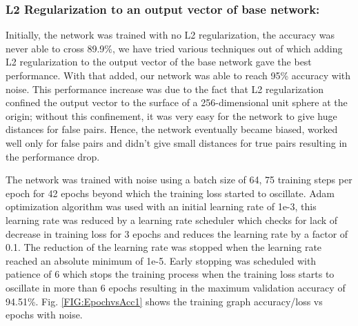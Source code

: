 \documentclass[10pt,twocolumn]{article}
\begin{document}
\subsubsection{L2 Regularization to an output vector of base network:}

Initially, the network was trained with no L2 regularization, the accuracy was never able to cross 89.9\%, we have tried various techniques out of which adding L2 regularization to the output vector of the base network gave the best performance. With that added, our network was able to reach 95\% accuracy with noise. This performance increase was due to the fact that L2 regularization confined the output vector to the surface of a 256-dimensional unit sphere at the origin; without this confinement, it was very easy for the network to give huge distances for false pairs. Hence, the network eventually became biased, worked well only for false pairs and didn't give small distances for true pairs resulting in the performance drop.

\label{Sec:results}
The network was trained with noise using a batch size of 64, 75 training steps per epoch for 42 epochs beyond which the training loss started to oscillate. Adam optimization algorithm was used with an initial learning rate of 1e-3, this learning rate was reduced by a learning rate scheduler which checks for lack of decrease in training loss for 3 epochs and reduces the learning rate by a factor of 0.1. The reduction of the learning rate was stopped when the learning rate reached an absolute minimum of 1e-5. Early stopping was scheduled with patience of 6 which stops the training process when the training loss starts to oscillate in more than 6 epochs resulting in the maximum validation accuracy of 94.51\%. Fig. \ref{FIG:EpochvsAcc1} shows the training graph accuracy/loss vs epochs with noise.
\end{document}
